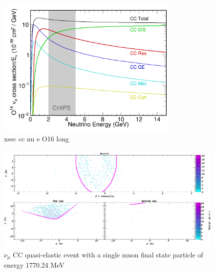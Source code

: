\begin{figure} %
    \includegraphics[width=0.8\textwidth]{diagrams/4-chips/xsec_cc_nu_e_O16.png}
    \caption[xsec cc nu e O16 short]
    {xsec cc nu e O16 long}
    \label{fig:xsec_cc_nu_e_O16}
\end{figure} %

\begin{figure} %
    \includegraphics[width=\textwidth]{diagrams/4-chips/sim_event.png}
    \caption[sim event short]
    {$\nu_{\mu}$ CC quasi-elastic event with a single muon final state particle of energy
        1770.24 MeV}
    \label{fig:sim_event}
\end{figure} %

